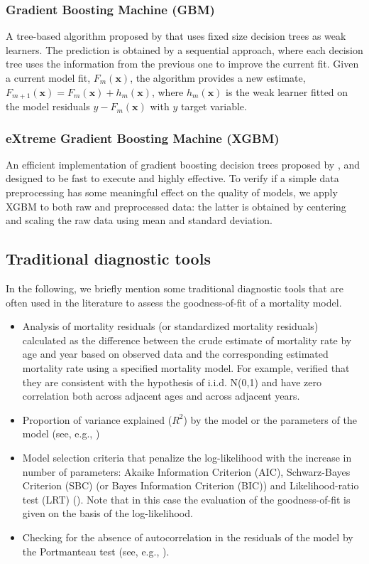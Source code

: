 \documentclass[fleqn,10pt]{wlscirep}
\begin{document}
\subsubsection*{Gradient Boosting Machine (GBM)}
A tree-based algorithm proposed by \cite{Friedman} that uses fixed size decision trees as weak learners. The prediction is obtained by a sequential approach, where each decision tree uses the information from the previous one to improve the current fit. Given a current model fit, $F_{m}(\mathbf{x})$, the algorithm provides a new estimate, $F_{m+1}(\mathbf{x})=F_{m}(\mathbf{x})+ h_m(\mathbf{x})$, where $h_m(\mathbf{x})$ is the weak learner fitted on the model residuals $y-F_{m}(\mathbf{x})$ with $y$ target variable.

\subsubsection*{eXtreme Gradient Boosting Machine (XGBM)}
An efficient implementation of gradient boosting decision trees proposed by \cite{Chen}, and designed to be fast to execute and highly effective. To verify if a simple data preprocessing has some meaningful effect on the quality of models, we apply XGBM to both raw and preprocessed data: the latter is obtained by centering and scaling the raw data using mean and standard deviation.

\color{blue}
\subsection*{Traditional diagnostic tools}
In the following, we briefly mention some traditional diagnostic tools that are often used in the literature to assess the goodness-of-fit of a mortality model. 
\begin{itemize}
\item Analysis of mortality residuals (or standardized mortality residuals) calculated as the difference between the crude estimate of mortality rate by age and year based on observed data and the corresponding estimated mortality rate using a specified mortality model. For example, \cite{Cairns2010} verified that they are consistent with the hypothesis of i.i.d. N(0,1) and have zero correlation both across adjacent ages and across adjacent years.
\item Proportion of variance explained ($R^2$) by the model or the parameters of the model (see, e.g., \cite{Bongaarts2005})
\item Model selection criteria that penalize the log-likelihood with the increase in number of parameters: Akaike Information Criterion (AIC), Schwarz-Bayes Criterion (SBC) (or Bayes Information Criterion (BIC)) and Likelihood-ratio test (LRT) (\cite{Li2009}). Note that in this case the evaluation of the goodness-of-fit is given on the basis of the log-likelihood.
\item Checking for the absence of autocorrelation in the residuals of the model by the Portmanteau test (see, e.g., \cite{Torri2011}).
\end{itemize}
\color{black}
\end{document}
